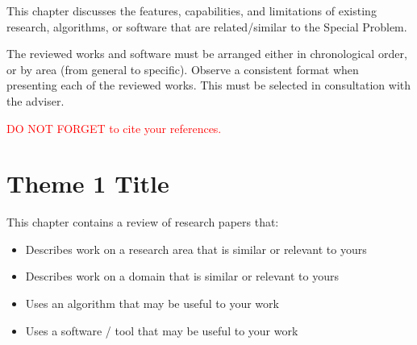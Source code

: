\label{sec:relatedlit}

This chapter discusses the features, capabilities, and limitations of existing research, algorithms, or software  that are related/similar to the Special Problem.

 The reviewed works and software must be arranged either in chronological order, or by area (from general to specific).  
Observe a consistent format when presenting each of the reviewed works. 
This must be selected in consultation with the  adviser.

\textcolor{red}{DO NOT FORGET to cite your references.}

\section{Theme 1 Title}
This chapter  contains a review of research papers that:
%
%
\begin{itemize}
\item Describes work on a research area that is similar or relevant to yours
\item Describes work on a domain that is similar or relevant to yours
\item Uses an algorithm that may be useful to your work
\item Uses a software / tool that may be useful to your work
\end{itemize}


